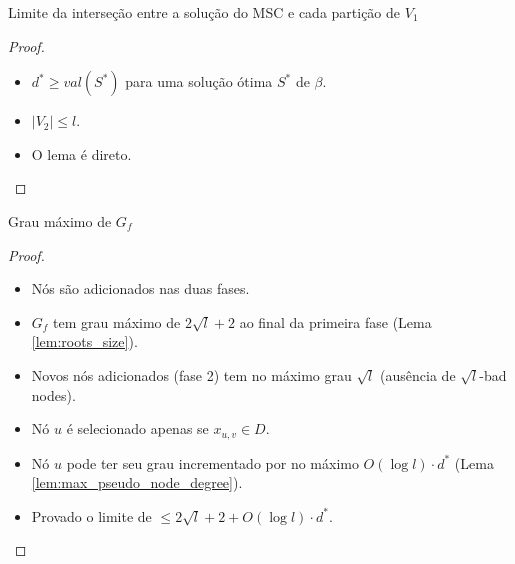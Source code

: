 \documentclass[10pt]{beamer}
\begin{document}
\begin{frame}{Limite da interseção entre a solução do MSC e cada partição de $V_1$ \hyperlink{max_pseudo_node_degree}{}}
\hypertarget{max_pseudo_node_degree_slide}{}
  \begin{proof}%
    \begin{itemize}
      \item <2-> $d^* \ge val(S^*)$ para uma solução ótima $S^*$ de $\beta$.
      \item <3-> $|V_2| \le l$.
      \item <4-> O lema é direto.
    \end{itemize}
  \end{proof}
\end{frame}

\begin{frame}{Grau máximo de $G_f$ \hyperlink{max_degree}{}}
\hypertarget{max_degree_slide}{}
  \begin{proof}%
    \begin{itemize}
      \item <1-> Nós são adicionados nas duas fases. 
      \item <2-> $G_f$ tem grau máximo de $2\sqrt{l} + 2$ ao final da primeira fase (Lema \ref{lem:roots_size}).
      \item <3-> Novos nós adicionados (fase 2) tem no máximo grau $\sqrt{l}$ (ausência de $\sqrt{l}$-bad nodes).
      \item <4-> Nó $u$ é selecionado apenas se $x_{u,v} \in D$.
      \item <5-> Nó $u$ pode ter seu grau incrementado por no máximo $O(\log l) \cdot d^*$ (Lema \ref{lem:max_pseudo_node_degree}).
      \item <6-> Provado o limite de $\leq 2\sqrt{l} + 2 + O(\log l) \cdot d^*$.
    \end{itemize}
  \end{proof}
\end{frame}
\end{document}
